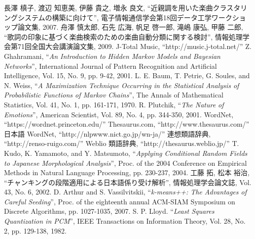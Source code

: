 \documentclass{jpreprint}
\begin{document}
\begin{multicols}{2}
%
%

{\small
\begin{thebibliography}{99}
    長澤 槙子, 渡辺 知恵美, 伊藤 貴之, 増永 良文, 
    “近親調を用いた楽曲クラスタリングシステムの構築に向けて”,
    電子情報通信学会第18回データ工学ワークショップ論文集, 2007.
    舟澤 慎太郎, 石先 広海, 帆足 啓一郎, 滝嶋 康弘, 甲藤 二郎,
    “歌詞の印象に基づく楽曲検索のための楽曲自動分類に関する検討”,
    情報処理学会第71回全国大会講演論文集, 2009.
    J-Total Music, “http://music.j-total.net/”
    Z. Ghahramani,
    “\textit{An Introduction to Hidden Markov Models and Bayesian Networks}”,
    International Journal of Pattern Recognition and Artificial Intelligence,
    Vol. 15, No. 9, pp. 9-42, 2001.
    L. E. Baum, T. Petrie, G. Soules, and N. Weiss,
    “\textit{A Maximization Technique Occurring in the Statistical Analysis of Probabilistic Functions of Markov Chains}”,
    The Annals of Mathematical Statistics, Vol. 41, No. 1, pp. 161-171,
    1970.
    R. Plutchik,
    “\textit{The Nature of Emotions}”,
    American Scientist, Vol. 89, No. 4, pp. 344-350, 2001.
    WordNet, “https://wordnet.princeton.edu/”
    Thesaurus.com, “http://www.thesaurus.com/”
    日本語 WordNet, “http://nlpwww.nict.go.jp/wn-ja/”
    連想類語辞典, “http://renso-ruigo.com/”
    Weblio 類語辞典, “http://thesaurus.weblio.jp/”
    T. Kudo, K. Yamamoto, and Y. Matsumoto,
    “\textit{Applying Conditional Random Fields to Japanese Morphological Analysis}”,
    Proc. of the 2004 Conference on Empirical Methods in Natural Language Processing, pp. 230-237, 2004.
    工藤 拓, 松本 裕治, 
    “チャンキングの段階適用による日本語係り受け解析”,
    情報処理学会論文誌, Vol. 43, No. 6, 2002.
    D. Arthur and S. Vassilvitskii,
    “\textit{k-means++: The Advantages of Careful Seeding}”,
    Proc. of the eighteenth annual ACM-SIAM Symposium on Discrete Algorithms, pp. 1027-1035, 2007.
    S. P. Lloyd.
    “\textit{Least Squares Quantization in PCM}”,
    IEEE Transactions on Information Theory, Vol. 28, No. 2, pp. 129-138, 1982.
\end{thebibliography}
}

\end{multicols}
\end{document}
